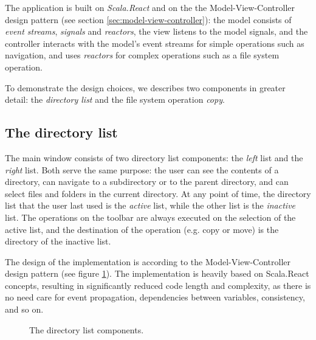 The application is built on \emph{Scala.React} and on the the Model-View-Controller design pattern (see section \ref{sec:model-view-controller}): the model consists of \emph{event streams},  \emph{signals} and \emph{reactors}, the view listens to the model signals, and the controller interacts with the model's event streams for simple operations such as navigation, and uses \emph{reactors} for complex operations such as a file system operation.

To demonstrate the design choices, we describes two components in greater detail: the \emph{directory list} and the file system operation \emph{copy}.

\subsection{The directory list}

The main window consists of two directory list components: the \emph{left} list and the \emph{right} list. Both serve the same purpose: the user can see the contents of a directory, can navigate to a subdirectory or to the parent directory, and can select files and folders in the current directory. At any point of time, the directory list that the user last used is the \emph{active} list, while the other list is the \emph{inactive} list. The operations on the toolbar are always executed on the selection of the active list, and the destination of the operation (e.g. copy or move) is the directory of the inactive list.

The design of the implementation is according to the Model-View-Controller design pattern (see figure \ref{fig:mvc_pattern}). The implementation is heavily based on Scala.React concepts, resulting in significantly reduced code length and complexity, as there is no need care for event propagation, dependencies between variables, consistency, and so on.


\begin{figure}[h!]
\centering
{}
\caption{The directory list components.}
\label{fig:mvc_pattern}
\end{figure}


